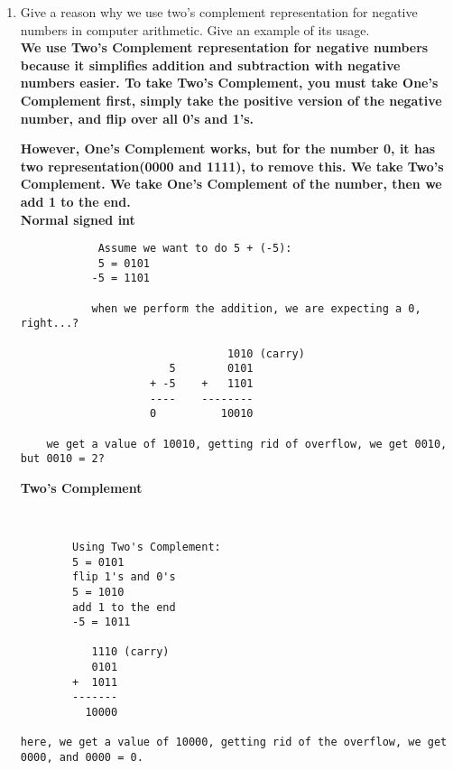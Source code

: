 \documentclass{article}
\begin{document}
\begin{enumerate}
        \item Give a reason why we use two’s complement representation for negative numbers in computer
        arithmetic. Give an example of its usage.\\[0.25in]
        \textbf{
            We use Two's Complement representation for negative numbers 
            because it simplifies addition and subtraction with negative 
            numbers easier. To take Two's Complement, you must take One's 
            Complement first, simply take the positive version of the negative 
            number, and flip over all 0's and 1's.
        }
        
        \textbf{
            However, One's Complement works, but for the number 0, it has two
            representation(0000 and 1111), to remove this. We take Two's
            Complement. We take One's Complement of the number, then we add 1
            to the end.
        }\\[0.25in]

        \textbf{Normal signed int}
        \begin{verbatim}
            Assume we want to do 5 + (-5): 
            5 = 0101
           -5 = 1101

           when we perform the addition, we are expecting a 0, right...?
           
                                1010 (carry)
                       5        0101
                    + -5    +   1101
                    ----    --------
                    0          10010
            
    we get a value of 10010, getting rid of overflow, we get 0010, but 0010 = 2?
        \end{verbatim}

        \textbf{Two's Complement}
        \begin{verbatim}
            

        Using Two's Complement: 
        5 = 0101
        flip 1's and 0's
        5 = 1010
        add 1 to the end
        -5 = 1011

           1110 (carry)
           0101
        +  1011
        -------
          10000

here, we get a value of 10000, getting rid of the overflow, we get 0000, and 0000 = 0.
        \end{verbatim}
    \end{enumerate}
\end{document}
